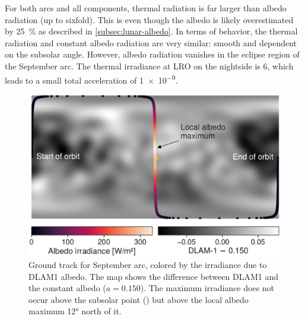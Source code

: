 For both arcs and all components, thermal radiation is far larger than albedo radiation (up to sixfold). This is even though the albedo is likely overestimated by \qty{25}{\percent} as described in \cref{subsec:lunar-albedo}. In terms of behavior, the thermal radiation and constant albedo radiation are very similar: smooth and dependent on the subsolar angle. However, albedo radiation vanishes in the eclipse region of the September arc. The thermal irradiance at \gls{LRO} on the nightside is \qty{6}{\irr}, which leads to a small total acceleration of \qty{1e-9}{\acc}.


\begin{figure}[htb]
    \centering
    \includegraphics[width=\linewidth]{figures/plots/groundtrack.pdf}
    \caption{Ground track for September arc, colored by the irradiance due to \gls{DLAM1} albedo. The map shows the difference between \gls{DLAM1} and the constant albedo ($a=0.150$). The maximum irradiance does not occur above the subsolar point (\textcolor{mpl-yellow}{}) but above the local albedo maximum \ang{12} north of it.}
    \label{fig:groundtrack}
\end{figure}

